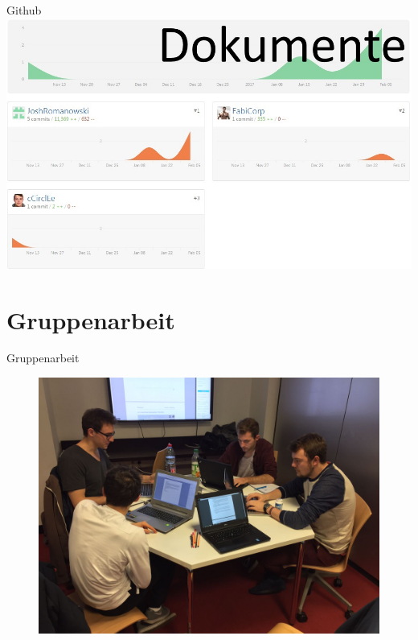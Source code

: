 \documentclass[19pt]{beamer}
\begin{document}
\begin{frame}{Github}
\includegraphics[scale=0.2]{resources/GithubImp.jpg}
\end{frame}

\section{Gruppenarbeit}
\begin{frame}{Gruppenarbeit}
	\begin{figure}
		\begin{center}
			\includegraphics[scale=0.16]{resources/Gruppenarbeit} 
		\end{center}
	\end{figure}	 
\end{frame}
\end{document}
